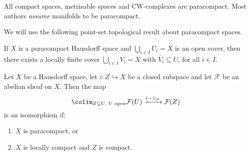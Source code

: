 \begin{exmp}
All compact spaces, metrisable spaces and CW-complexes are paracompact.
Most authors \emph{assume} manifolds to be paracompact.
\end{exmp}

We will use the following point-set topological result about paracompact spaces.

\begin{lem}[name={\cite[Lemma~41.6]{MunkresTopology}}]\label{lem:paracompact-locally-finite-cover}
If \(X\) is a paracompact Hausdorff space and \(\bigcup_{i\in I}U_i=X\) is an open cover, then there exists a locally finite cover \(\bigcup_{i\in I}V_i=X\) with \(\overline{V_i}\subseteq U_i\) for all \(i\in I\).
\end{lem}

\begin{prop}\label{prop:restriction-map-isomorphism-paracompact}
Let \(X\) be a Hausdorff space, let \(i\colon Z\hookrightarrow X\) be a closed subspace and let \(\mathcal F\) be an abelian sheaf on \(X\).
Then the map
\begin{equation}
  \label{eq:restriction-map-isomorphism-paracompact}
  \colim_{Z\subseteq U\text{, }U\textup{ open}}\mathcal F(U) \xrightarrow{(-)|_Z} \mathcal F(Z)
\end{equation}
is an isomorphism if:
\begin{enumerate}
\item\label{prop:restriction-map-isomorphism-paracompact:paracompact} \(X\) is paracompact, or
\item\label{prop:restriction-map-isomorphism-paracompact:locally-compact} \(X\) is locally compact and \(Z\) is compact.
\end{enumerate}
\end{prop}

